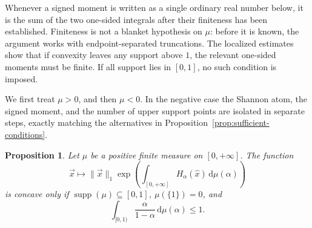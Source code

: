 \documentclass[aps,pra,11pt,onecolumn,nofootinbib,tightenlines]{revtex4-2}
\newtheorem{proposition}[theorem]{Proposition}
\theoremstyle{definition}
\def \d {\mathrm{d}}
\begin{document}
Whenever a signed moment is written as a single ordinary real number below, it is
the sum of the two one-sided integrals after their finiteness has been established.
Finiteness is not a blanket hypothesis on $\mu$: before it is known, the argument
works with endpoint-separated truncations.  The localized estimates show that if
convexity leaves any support above $1$, the relevant one-sided moments must be
finite.  If all support lies in $[0,1]$, no such condition is imposed.

We first treat $\mu>0$, and then $\mu<0$.  In the negative case the Shannon atom,
the signed moment, and the number of upper support points are isolated in separate
steps, exactly matching the alternatives in
Proposition~\ref{prop:sufficient-conditions}.

\begin{proposition}
\label{prop:first-measure}
Let $\mu$ be a positive finite measure on $[0,+\infty]$.  The function
\begin{equation}
\vec{x}\longmapsto\|\vec{x}\|_1
\exp\!\left(\int_{[0,+\infty]}H_\alpha(\hat{x})\,
\d\mu(\alpha)\right)
\end{equation}
is concave only if
$\operatorname{supp}(\mu)\subseteq[0,1]$, $\mu(\{1\})=0$, and
\begin{equation}
\int_{[0,1)}\frac{\alpha}{1-\alpha}\,\d\mu(\alpha)\leq1.
\end{equation}
\end{proposition}
\end{document}
